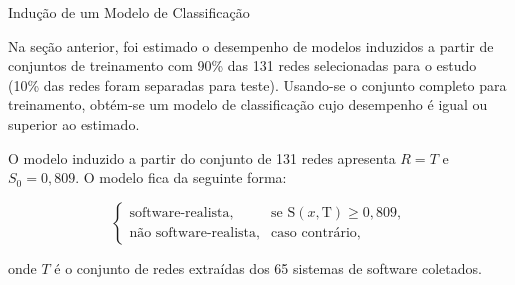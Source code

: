 \begin{section}{Indução de um Modelo de Classificação} \label{cap:clas4}
	
	Na seção anterior, foi estimado o desempenho de modelos induzidos a partir de conjuntos de treinamento com 90\% das 131 redes selecionadas para o estudo (10\% das redes foram separadas para teste). Usando-se o conjunto completo para treinamento, obtém-se um modelo de classificação cujo desempenho é igual ou superior ao estimado.
	
	O modelo induzido a partir do conjunto de 131 redes apresenta $R = T$ e $S_0 = 0,809$. O modelo fica da seguinte forma:
	
	$$
	\left\{
	\begin{array}{cl}
	\mbox{software-realista,} & \mbox{se } \mathrm{S}(x, \mbox{T}) \ge 0,809, \\
	\mbox{não software-realista,} & \mbox{caso contrário,}
	\end{array}
	\right.
	$$

	onde $T$ é o conjunto de redes extraídas dos 65 sistemas de software coletados.
	
	
	
\end{section}

